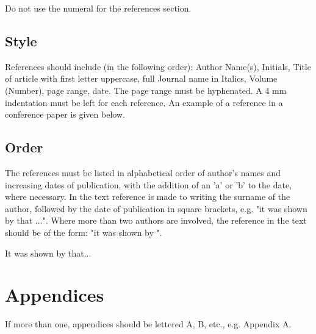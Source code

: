 \documentclass[a4paper]{article}
\begin{document}
Do not use the numeral for the references section.

\subsection*{Style}
References should include (in the following order): Author Name(s), Initials, Title of article with first letter uppercase, full Journal name in Italics, Volume (Number), page range, date.  The page range must be hyphenated. A 4 mm indentation must be left for each reference. An example of a reference in a conference paper is given below.

\subsection*{Order}

The references must be listed in alphabetical order of author's
names and increasing dates of publication, with the addition of an
'a' or 'b' to the date, where necessary.  In the text reference is
made to writing the surname of the author, followed by the date of
publication in square brackets, e.g. "it was shown by
\citet{hanke:dfwudc} that ...". Where more than two authors are
involved, the reference in the text should be of the form: "it was
shown by \citet{churchman:itor}".

It was shown by \citet{berry:teomowcihbsi} that...




\section*{Appendices}
If more than one, appendices should be lettered A, B, etc., e.g.
Appendix A.
\end{document}
